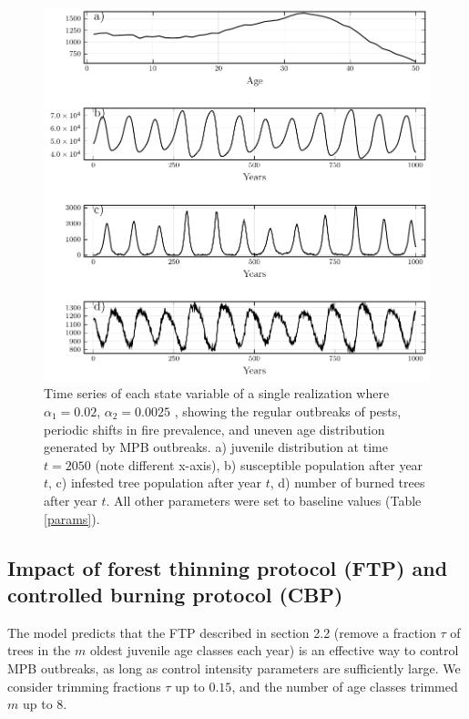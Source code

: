    
    \begin{figure}
      \includegraphics[width=\textwidth]{chapter_3/z1_ts.pdf}
      \caption{Time series of each state variable of a single realization where  $\alpha_1 = 0.02$, $\alpha_2 = 0.0025$ , showing the regular outbreaks of pests, periodic shifts in fire prevalence, and uneven age distribution generated by MPB outbreaks. a) juvenile distribution at time $t=2050$ (note different x-axis), b) susceptible population after year $t$, c) infested tree population after year $t$, d) number of burned trees after year $t$. All other parameters were set to baseline values (Table \ref{params}).}
      \label{z1}
    \end{figure}
    
\subsection{Impact of forest thinning protocol (FTP) and controlled burning protocol (CBP)} 

The model predicts that the FTP described in section 2.2 (remove a fraction $\tau$ of trees in the $m$ oldest juvenile age classes each year) is an effective way to control MPB outbreaks, as long as control intensity parameters are sufficiently large. We consider trimming fractions $\tau$ up to $0.15$, and the number of age classes trimmed $m$ up to 8.


